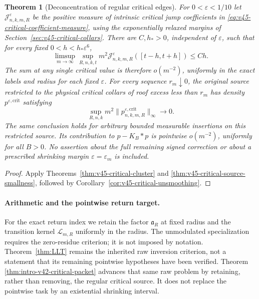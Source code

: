 \documentclass[11pt,reqno]{amsart}
\numberwithin{equation}{section}
\newtheorem{leadtheorem}{Theorem}
\theoremstyle{definition}\newtheorem{definition}[theorem]{Definition}
\theoremstyle{remark}\newtheorem{remark}[theorem]{Remark}
\begin{document}
\begin{leadtheorem}[Deconcentration of regular critical edges]
\label{thm:intro-v45-critical-cluster}
For $0<\varepsilon<1/10$ let $\mathcal J^\varepsilon_{n,k,m,R}$ be the
positive measure of intrinsic critical jump coefficients in
\eqref{eq:v45-critical-coefficient-measure}, using the exponentially
relaxed margins of Section~\ref{sec:v45-critical-collars}. There are
$C,h_*>0$, independent of $\varepsilon$, such that for every fixed
$0<h<h_*\varepsilon^6$,
\[
 \limsup_{m\to\infty}\sup_{R,n,k,t}
       m^2\mathcal J^\varepsilon_{n,k,m,R}([t-h,t+h])\le Ch.
\]
The sum at any single critical value is therefore $o(m^{-2})$,
uniformly in the exact labels and radius for each fixed $\varepsilon$.
For every sequence $r_m\downarrow0$, the original source restricted
to the physical critical collars of roof excess less than $r_m$ has
density $p^{\varepsilon,\mathrm{crit}}$ satisfying
\[
 \sup_{R,n,k}m^2\|p^{\varepsilon,\mathrm{crit}}_{n,k,m,R}\|_\infty
       \longrightarrow0.
\]
The same conclusion holds for arbitrary bounded measurable insertions
on this restricted source. Its contribution to $p-K_B*p$ is pointwise
$o(m^{-2})$, uniformly for all $B>0$. No assertion about the full
remaining signed correction or about a prescribed shrinking margin
$\varepsilon=\varepsilon_m$ is included.
\end{leadtheorem}
\begin{proof}
Apply Theorems~\ref{thm:v45-critical-cluster} and
\ref{thm:v45-critical-source-smallness}, followed by
Corollary~\ref{cor:v45-critical-unsmoothing}.
\end{proof}

\paragraph{Arithmetic and the pointwise return target.}
For the exact return index we retain the factor $\mathfrak a_R$ at
fixed radius and the transition kernel $\mathcal L_{m,R}$ uniformly
in the radius. The unmodulated specialization requires the zero-residue
criterion; it is not imposed by notation. Theorem~\ref{thm:LLT}
remains the inherited raw inversion criterion, not a statement that
its remaining pointwise hypotheses have been verified. Theorem~
\ref{thm:intro-v42-critical-packet} advances that same raw problem by
retaining, rather than removing, the regular critical source. It does
not replace the pointwise task by an existential shrinking interval.
\end{document}
